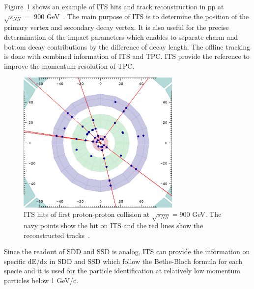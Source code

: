 Figure~\ref{fig_3_firstpp} shows an example of ITS hits and track reconstruction in pp at $\sqrt{s_{NN}}=$ 900 GeV~\cite{bib_firstpp}. 
The main purpose of ITS is to determine the position of the primary vertex and secondary decay vertex. 
It is also useful for the precise determination of the impact parameters which enables to separate charm and bottom decay contributions by the difference of decay length. 
The offline tracking is done with combined information of ITS and TPC. 
ITS provide the reference to improve the momentum resolution of TPC. 

\begin{figure}[!h]
  \centering
  \includegraphics[width=8cm]{chap3/figure/Vertexing/ALICEfirstevent_pPb.png}
  \caption{ITS hits of first proton-proton collision at $\sqrt{s_{NN}}=$900 GeV. The navy points show the hit on ITS and the red lines show the reconstructed tracks~\cite{bib_firstpp}.  }
  \label{fig_3_firstpp}
\end{figure}


Since the readout of SDD and SSD is analog, ITS can provide the information on specific dE/dx in SDD and SSD which follow the Bethe-Bloch formula for each specie and it is used for the particle identification at relatively low momentum particles below 1 GeV/c. 


